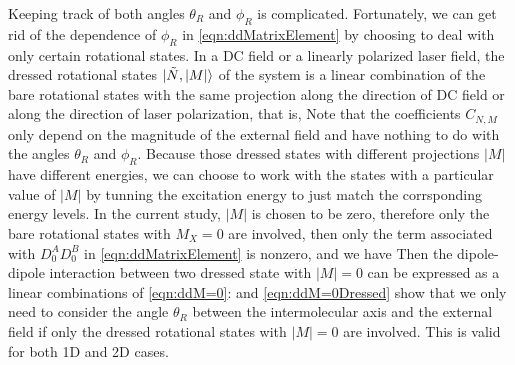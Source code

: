 
Keeping track of both angles $\theta_{R}$ and $\phi_{R}$ is complicated. Fortunately, we can get rid of the 
dependence of $\phi_{R}$ in \autoref{eqn:ddMatrixElement} by choosing to deal with only certain rotational states.  
In a DC field or a linearly polarized laser field, the dressed rotational states $| \Tilde{N}, |M| \rangle$ of the
system is a linear combination of the bare rotational states with the same projection along the direction of DC field 
or along the direction of laser polarization, that is,
Note that the coefficients $C_{N, M}$ only depend on the magnitude of the external field and have nothing to do  
with the angles $\theta_{R}$ and $\phi_{R}$. 
Because those dressed states with different 
projections $|M|$ have different energies, we can choose to work with the states with a particular value of $|M|$ 
by tunning the excitation energy to just match the corrsponding energy levels. 
In the current study, 
$|M|$ is chosen to be zero, therefore only the bare rotational states with $M_X = 0$ are involved, then only the
term associated with $D_0^A D_0^B$ in  \autoref{eqn:ddMatrixElement} is nonzero, and we have
Then the dipole-dipole interaction between two dressed state with $|M| = 0$ can be expressed as a linear combinations of \autoref{eqn:ddM=0}:
 and \autoref{eqn:ddM=0Dressed} show that we only need to consider the angle $\theta_{R}$
between the intermolecular axis and the external field if only the dressed rotational states with $|M|=0$ are
 involved. This is valid for both 1D and 2D cases.  

